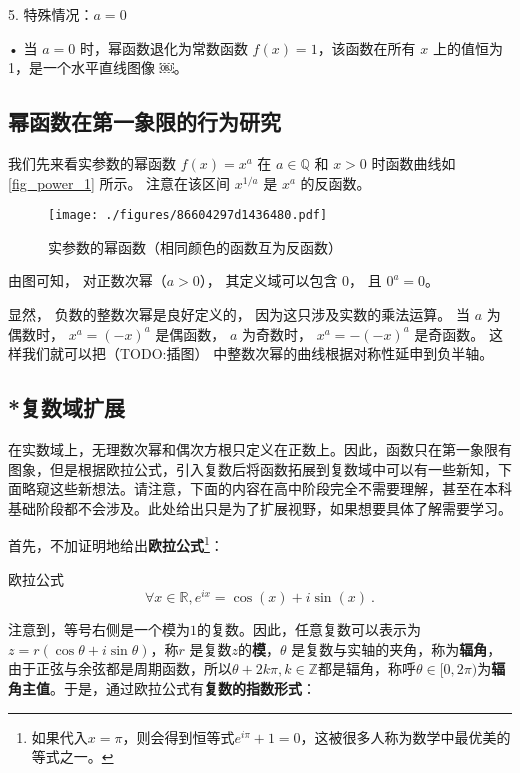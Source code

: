 5. 特殊情况：$a = 0$

	•	当 $a = 0$ 时，幂函数退化为常数函数 $f(x) = 1$，该函数在所有 $x$ 上的值恒为 1，是一个水平直线图像 ￼。



\subsection{幂函数在第一象限的行为研究}

我们先来看实参数的幂函数 $f(x) = x^a$ 在 $a\in\mathbb Q$ 和 $x > 0$ 时函数曲线如\autoref{fig_power_1} 所示。 注意在该区间 $x^{1/a}$ 是 $x^a$ 的反函数。

\begin{figure}[ht]
\centering
\texttt{[image: ./figures/86604297d1436480.pdf]}
\caption{实参数的幂函数（相同颜色的函数互为反函数）}\label{fig_power_1}
\end{figure}

由图可知， 对正数次幂（$a > 0$）， 其定义域可以包含 $0$， 且 $0^a = 0$。

显然， 负数的整数次幂是良好定义的， 因为这只涉及实数的乘法运算。 当 $a$ 为偶数时， $x^a = (-x)^a$ 是偶函数， $a$ 为奇数时， $x^a = -(-x)^a$ 是奇函数。 这样我们就可以把（TODO:插图） 中整数次幂的曲线根据对称性延申到负半轴。

\subsection{*复数域扩展}


在实数域上，无理数次幂和偶次方根只定义在正数上。因此，函数只在第一象限有图象，但是根据欧拉公式，引入复数后将函数拓展到复数域中可以有一些新知，下面略窥这些新想法。请注意，下面的内容在高中阶段完全不需要理解，甚至在本科基础阶段都不会涉及。此处给出只是为了扩展视野，如果想要具体了解需要学习。

首先，不加证明地给出\textbf{欧拉公式}\footnote{如果代入$x=\pi$，则会得到恒等式$e^{i\pi}+1=0$，这被很多人称为数学中最优美的等式之一。}：

\begin{theorem}{欧拉公式}
\begin{equation}
\forall x\in\mathbb{R},e^{ix} = \cos(x) + i\sin(x)~.
\end{equation}
\end{theorem}

注意到，等号右侧是一个模为$1$的复数。因此，任意复数可以表示为 $z = r (\cos \theta + i \sin \theta)$，称$r$ 是复数$z$的\textbf{模}，$\theta$ 是复数与实轴的夹角，称为\textbf{辐角}，由于正弦与余弦都是周期函数，所以$\theta+2k\pi,k\in\mathbb{Z}$都是辐角，称呼$\theta\in[0,2\pi)$为\textbf{辐角主值}。于是，通过欧拉公式有\textbf{复数的指数形式}：

